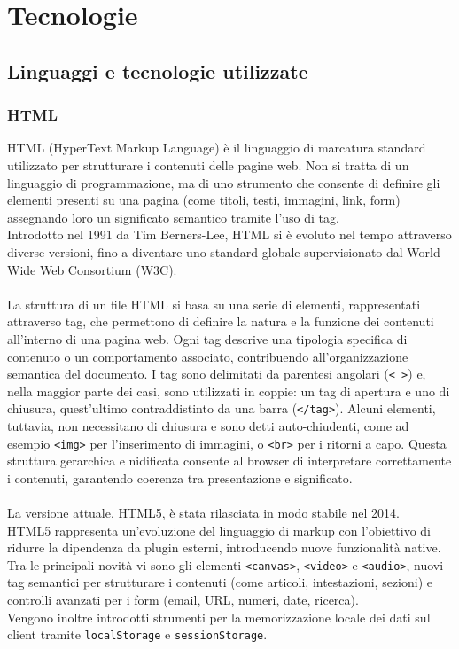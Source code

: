 \chapter{Tecnologie}
\label{chap:linguaggi-tecnologie}

\section{Linguaggi e tecnologie utilizzate}
\subsection{HTML}
\noindent HTML (HyperText Markup Language) è il linguaggio di marcatura standard utilizzato per strutturare i contenuti delle pagine web. Non si tratta di un linguaggio di programmazione, ma di uno strumento che consente di definire gli elementi presenti su una pagina (come titoli, testi, immagini, link, form) assegnando loro un significato semantico tramite l’uso di tag. \\
Introdotto nel 1991 da Tim Berners-Lee, HTML si è evoluto nel tempo attraverso diverse versioni, fino a diventare uno standard globale supervisionato dal World Wide Web Consortium (W3C).\\
\\
La struttura di un file HTML si basa su una serie di elementi, rappresentati attraverso tag, che permettono di definire la natura e la funzione dei contenuti all'interno di una pagina web. Ogni tag descrive una tipologia specifica di contenuto o un comportamento associato, contribuendo all'organizzazione semantica del documento. I tag sono delimitati da parentesi angolari (\texttt{< >}) e, nella maggior parte dei casi, sono utilizzati in coppie: un tag di apertura e uno di chiusura, quest’ultimo contraddistinto da una barra (\texttt{</tag>}). Alcuni elementi, tuttavia, non necessitano di chiusura e sono detti auto-chiudenti, come ad esempio \texttt{<img>} per l’inserimento di immagini, o \texttt{<br>} per i ritorni a capo. Questa struttura gerarchica e nidificata consente al browser di interpretare correttamente i contenuti, garantendo coerenza tra presentazione e significato.\\
\\
La versione attuale, HTML5, è stata rilasciata in modo stabile nel 2014.\\
HTML5 rappresenta un’evoluzione del linguaggio di markup con l’obiettivo di ridurre la dipendenza da plugin esterni, introducendo nuove funzionalità native. Tra le principali novità vi sono gli elementi \texttt{<canvas>}, \texttt{<video>} e \texttt{<audio>}, nuovi tag semantici per strutturare i contenuti (come articoli, intestazioni, sezioni) e controlli avanzati per i form (email, URL, numeri, date, ricerca). 
\\Vengono inoltre introdotti strumenti per la memorizzazione locale dei dati sul client tramite \texttt{localStorage} e \texttt{sessionStorage}.

